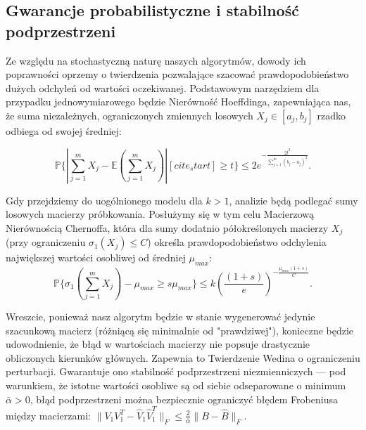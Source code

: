 \subsection{Gwarancje probabilistyczne i stabilność podprzestrzeni}


Ze względu na stochastyczną naturę naszych algorytmów, dowody ich poprawności oprzemy o twierdzenia pozwalające szacować prawdopodobieństwo dużych odchyleń od wartości oczekiwanej. Podstawowym narzędziem dla przypadku jednowymiarowego będzie Nierówność Hoeffdinga, zapewniająca nas, że suma niezależnych, ograniczonych zmiennych losowych $X_j \in [a_j, b_j]$ rzadko odbiega od swojej średniej:

$$\mathbb{P}\{ |\sum_{j=1}^m X_j - \mathbb{E}(\sum_{j=1}^m X_j)| [cite_start]\ge t \} \le 2e^{-\frac{2t^2}{\sum_{j=1}^m (b_j - a_j)^2}}.$$

Gdy przejdziemy do uogólnionego modelu dla $k>1$, analizie będą podlegać sumy losowych macierzy próbkowania. Posłużymy się w tym celu Macierzową Nierównością Chernoffa, która dla sumy dodatnio półokreślonych macierzy $X_j$ (przy ograniczeniu $\sigma_1(X_j) \le C$) określa prawdopodobieństwo odchylenia największej wartości osobliwej od średniej $\mu_{max}$:
$$\mathbb{P}\{\sigma_1(\sum_{j=1}^m X_j) - \mu_{max} \ge s\mu_{max}\} \le k(\frac{(1+s)}{e})^{-\frac{\mu_{max}(1+s)}{C}}.$$

Wreszcie, ponieważ nasz algorytm będzie w stanie wygenerować jedynie szacunkową macierz (różniącą się minimalnie od "prawdziwej"), konieczne będzie udowodnienie, że błąd w wartościach macierzy nie popsuje drastycznie obliczonych kierunków głównych. Zapewnia to Twierdzenie Wedina o ograniczeniu perturbacji. Gwarantuje ono stabilność podprzestrzeni niezmienniczych — pod warunkiem, że istotne wartości osobliwe są od siebie odseparowane o minimum $\bar{\alpha} > 0$, błąd podprzestrzeni można bezpiecznie ograniczyć błędem Frobeniusa między macierzami: $\|V_1 V_1^T - \hat{V}_1 \hat{V}_1^T\|_F \le \frac{2}{\bar{\alpha}}\|B - \hat{B}\|_F$.